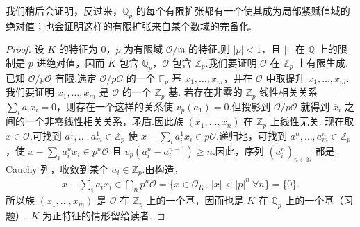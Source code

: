 我们稍后会证明，反过来，$\mathbb Q_p$ 的每个有限扩张都有一个使其成为局部紧赋值域的绝对值；也会证明这样的有限扩张来自某个数域的完备化.
\begin{proof}
设 $K$ 的特征为 $0$，$p$ 为有限域 $\mathcal O/\mathfrak m$ 的特征.则 $|p|<1$，且 $|\cdot|$ 在 $\mathbb Q$ 上的限制是 $p$ 进绝对值，因而 $K$ 包含 $\mathbb Q_p$，$\mathcal O$ 包含 $\mathbb Z_p$.我们要证明 $\mathcal O$ 在 $\mathbb Z_p$ 上有限生成.已知 $\mathcal O/p\mathcal O$ 有限.选定 $\mathcal O/p\mathcal O$ 的一个 $\mathbb F_p$ 基 $\overline x_1,\ldots,\overline x_m$，并在 $\mathcal O$ 中取提升 $x_1,\ldots,x_m$.我们要证明 $x_1,\ldots,x_m$ 是 $\mathcal O$ 的一个 $\mathbb Z_p$ 基.
若存在非零的 $\mathbb Z_p$ 线性相关关系 $\sum_i a_ix_i=0$，则存在一个这样的关系使 $v_p(a_1)=0$.但投影到 $\mathcal O/p\mathcal O$ 就得到 $\overline x_i$ 之间的一个非零线性相关关系，矛盾.因此族 $(x_1,\ldots,x_n)$ 在 $\mathbb Z_p$ 上线性无关.
现在取 $x\in\mathcal O$.可找到 $a_1^1,\ldots,a_m^1\in\mathbb Z_p$ 使 $x-\sum_i a_i^1x_i\in p\mathcal O$.递归地，可找到 $a_1^n,\ldots,a_m^n\in\mathbb Z_p$，使 $x-\sum_i a_i^nx_i\in p^n\mathcal O$ 且 $v_p(a_i^n-a_i^{n-1})\ge n$.因此，序列 $(a_i^n)_{n\in\mathbb N}$ 都是 Cauchy 列，收敛到某个 $a_i\in\mathbb Z_p$.由构造，
\begin{align*}
x-\sum_i a_ix_i\in\bigcap_n p^n\mathcal O
=\{x\in\mathcal O_K,\ |x|<|p|^n\ \forall n\}=\{0\}.
\end{align*}
所以族 $(x_1,\ldots,x_m)$ 是 $\mathcal O$ 在 $\mathbb Z_p$ 上的一个基，因而也是 $K$ 在 $\mathbb Q_p$ 上的一个基（习题）.
$K$ 为正特征的情形留给读者.
\end{proof}
